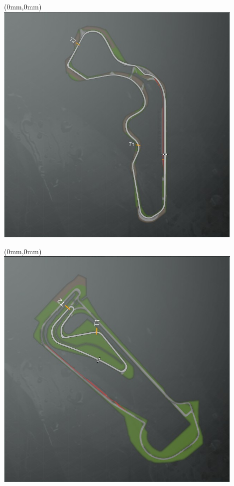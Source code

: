 \null\newpage
\begin{textblock*}{30mm}(0mm,0mm)%
\includegraphics[width=120mm]{TR/2015-05-20_00053.png}
\end{textblock*}
\null\newpage
\begin{textblock*}{30mm}(0mm,0mm)%
\includegraphics[width=120mm]{TR/2015-05-20_00062.png}
\end{textblock*}
